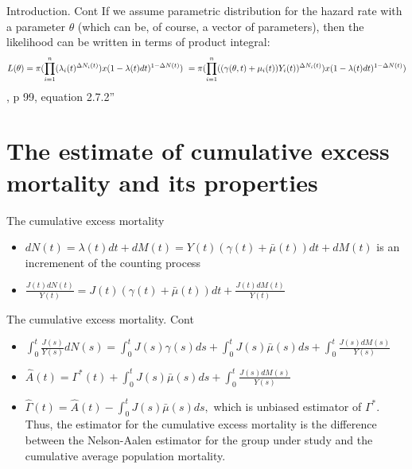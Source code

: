 \documentclass{beamer}
\begin{document}
\begin{frame}{Introduction. Cont}
    If we assume parametric distribution for the hazard rate with a parameter $\theta$ (which can be, of course, a vector of parameters), then the likelihood can be written in terms of product integral:
    \begin{equation}
        L(\theta) =  \pi (\prod_{i=1}^n (\lambda_i(t)^{\Delta N_i(t)}) x (1-\lambda(t)dt)^{1-\Delta N(t)}) \\\
    = \pi (\prod_{i=1}^n((\gamma(\theta,t) + \mu_i(t))Y_i(t))^{\Delta N_i(t)}) x (1 - \lambda(t)dt)^{1-\Delta N(t)})
    \end{equation}
    \newline
    \newline
    \cite{andersen}, p 99, equation 2.7.2''
    
\end{frame}




\section{The estimate of cumulative excess mortality and its properties}
  \begin{frame}{The cumulative excess mortality}
 \begin{itemize} 
   \item $dN(t) = \lambda(t)dt + dM(t) = Y(t) (\gamma(t) + \bar\mu(t)) dt + dM(t)$ is an incremenent of the counting process
   \newline
   \item $\frac{J(t) dN(t)}{Y(t)} = J(t)(\gamma(t) + \bar\mu(t)) dt + \frac{J(t)dM(t)}{Y(t)}$
   \end{itemize}
\end{frame} 
   
   \begin{frame}{The cumulative excess mortality. Cont}
   \begin{itemize} 
   \item $\int_0^t \frac{J(s)}{Y(s)}dN(s) = \int_0^t J(s)\gamma(s) ds + \int_0^t J(s)\bar\mu(s)ds + \int_0^t \frac{J(s)dM(s)}{Y(s)}$
   \newline
   \item $\hat A(t) = \Gamma^*(t) + \int_0^t J(s)\bar\mu(s)ds + \int_0^t \frac{J(s)dM(s)}{Y(s)}$ 
    \item $\hat\Gamma(t) = \hat A(t) - \int_0^t J(s) \bar\mu(s) ds,$
   \newline
   which is unbiased estimator of $\Gamma^*$.
  \newline
  \newline
   Thus, the estimator for the cumulative excess mortality is the difference between the Nelson-Aalen estimator for the group under study and the cumulative average population mortality.
   \end{itemize}
\end{frame}
\end{document}
